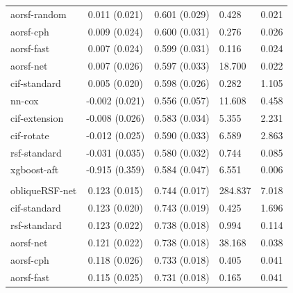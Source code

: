 \documentclass[twoside,11pt]{article}\usepackage[]{graphicx}\usepackage[]{xcolor}
\newenvironment{knitrout}{}{} %
\begin{document}
\begin{knitrout}
\begin{longtable}[t]{lcclc}
\hspace{1em}aorsf-random & 0.011 (0.021) & 0.601 (0.029) & 0.428 & 0.021\\
\hspace{1em}aorsf-cph & 0.009 (0.024) & 0.600 (0.031) & 0.276 & 0.026\\
\hspace{1em}aorsf-fast & 0.007 (0.024) & 0.599 (0.031) & 0.116 & 0.024\\
\hspace{1em}aorsf-net & 0.007 (0.026) & 0.597 (0.033) & 18.700 & 0.022\\
\hspace{1em}cif-standard & 0.005 (0.020) & 0.598 (0.026) & 0.282 & 1.105\\
\hspace{1em}nn-cox & -0.002 (0.021) & 0.556 (0.057) & 11.608 & 0.458\\
\hspace{1em}cif-extension & -0.008 (0.026) & 0.583 (0.034) & 5.355 & 2.231\\
\hspace{1em}cif-rotate & -0.012 (0.025) & 0.590 (0.033) & 6.589 & 2.863\\
\hspace{1em}rsf-standard & -0.031 (0.035) & 0.580 (0.032) & 0.744 & 0.085\\
\hspace{1em}xgboost-aft & -0.915 (0.359) & 0.584 (0.047) & 6.551 & 0.006\\
\addlinespace[0.3em]
\hline
\multicolumn{5}{l}{\textit{\textbf{GBSG II; recurrence or death, n = 686, p = 10}}}\\
\hline
\hspace{1em}obliqueRSF-net & 0.123 (0.015) & 0.744 (0.017) & 284.837 & 7.018\\
\hspace{1em}cif-standard & 0.123 (0.020) & 0.743 (0.019) & 0.425 & 1.696\\
\hspace{1em}rsf-standard & 0.123 (0.022) & 0.738 (0.018) & 0.994 & 0.114\\
\hspace{1em}aorsf-net & 0.121 (0.022) & 0.738 (0.018) & 38.168 & 0.038\\
\hspace{1em}aorsf-cph & 0.118 (0.026) & 0.733 (0.018) & 0.405 & 0.041\\
\hspace{1em}aorsf-fast & 0.115 (0.025) & 0.731 (0.018) & 0.165 & 0.041\\

\end{longtable}
\end{knitrout}
\end{document}
